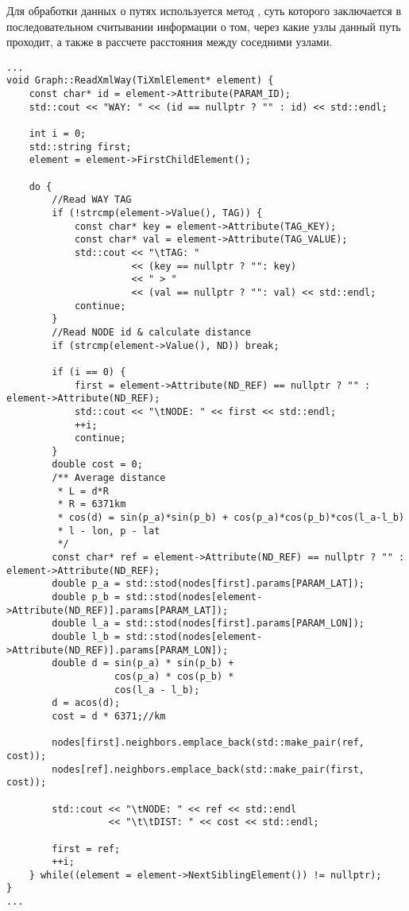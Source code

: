 \par Для обработки данных о путях используется метод , суть
которого заключается в последовательном считывании информации о том, через какие
узлы данный путь проходит, а также в рассчете расстояния между соседними узлами.
\begin{lstlisting}[caption=method ReadXmlNode (Graph.cpp), style=customcpp]
...
void Graph::ReadXmlWay(TiXmlElement* element) {
    const char* id = element->Attribute(PARAM_ID);
    std::cout << "WAY: " << (id == nullptr ? "" : id) << std::endl;

    int i = 0;
    std::string first;
    element = element->FirstChildElement();

    do {
        //Read WAY TAG
        if (!strcmp(element->Value(), TAG)) {
            const char* key = element->Attribute(TAG_KEY);
            const char* val = element->Attribute(TAG_VALUE);
            std::cout << "\tTAG: "
                      << (key == nullptr ? "": key)
                      << " > "
                      << (val == nullptr ? "": val) << std::endl;
            continue;
        }
        //Read NODE id & calculate distance
        if (strcmp(element->Value(), ND)) break;

        if (i == 0) {
            first = element->Attribute(ND_REF) == nullptr ? "" : element->Attribute(ND_REF);
            std::cout << "\tNODE: " << first << std::endl;
            ++i;
            continue;
        }
        double cost = 0;
        /** Average distance
         * L = d*R
         * R = 6371km
         * cos(d) = sin(p_a)*sin(p_b) + cos(p_a)*cos(p_b)*cos(l_a-l_b)
         * l - lon, p - lat
         */
        const char* ref = element->Attribute(ND_REF) == nullptr ? "" : element->Attribute(ND_REF);
        double p_a = std::stod(nodes[first].params[PARAM_LAT]);
        double p_b = std::stod(nodes[element->Attribute(ND_REF)].params[PARAM_LAT]);
        double l_a = std::stod(nodes[first].params[PARAM_LON]);
        double l_b = std::stod(nodes[element->Attribute(ND_REF)].params[PARAM_LON]);
        double d = sin(p_a) * sin(p_b) +
                   cos(p_a) * cos(p_b) *
                   cos(l_a - l_b);
        d = acos(d);
        cost = d * 6371;//km

        nodes[first].neighbors.emplace_back(std::make_pair(ref, cost));
        nodes[ref].neighbors.emplace_back(std::make_pair(first, cost));

        std::cout << "\tNODE: " << ref << std::endl
                  << "\t\tDIST: " << cost << std::endl;

        first = ref;
        ++i;
    } while((element = element->NextSiblingElement()) != nullptr);
}
...
\end{lstlisting}

